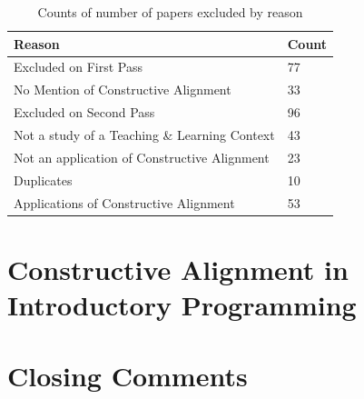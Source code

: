 \begin{table}[htbp]
	\centering
	\caption{Counts of number of papers excluded by reason}
	\label{tbl:exclude_reason}
	\footnotesize
    \begin{tabular}{ll}
    \textbf{Reason} & \textbf{Count} \\ \hline
    Excluded on First Pass & 77 \\
    No Mention of Constructive Alignment & 33 \\
    Excluded on Second Pass & 96 \\
    Not a study of a Teaching \& Learning Context & 43 \\
    Not an application of Constructive Alignment & 23 \\
    Duplicates & 10 \\ \hline
    Applications of Constructive Alignment & 53 \\
    \end{tabular}
\end{table}





\section{Constructive Alignment in Introductory Programming} %
\label{sec:constructive_alignment_in_introductory_programming}


\section{Closing Comments} %
\label{sec:closing_comments}


